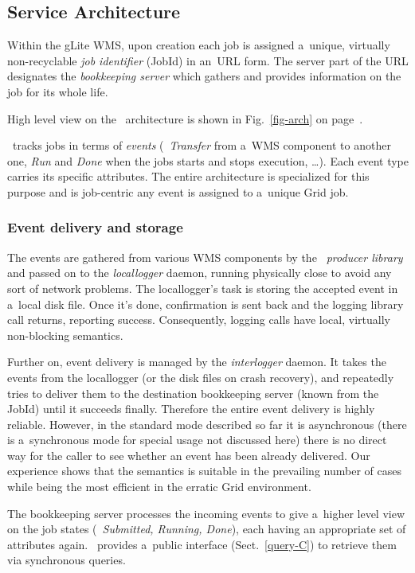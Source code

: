 \subsection{Service Architecture}

Within the gLite WMS, upon creation
 each job is assigned a~unique, virtually non-recyclable
\emph{job identifier} (JobId) in an~URL form.
The server part of the URL designates the \emph{bookkeeping server} which
gathers and provides information on the job for its whole life.

High level view on the \LB\ architecture is shown in Fig.~\ref{fig-arch}
on page~\pageref{fig-arch}.

\LB\ tracks jobs in terms of \emph{events} (\eg\ \emph{Transfer} from a~WMS
component to another one, \emph{Run} and \emph{Done} when the jobs starts
and stops execution, \dots).
Each event type carries its specific attributes.
The entire architecture is specialized for this purpose and is job-centric\Dash
any event is assigned to a~unique Grid job.

\subsubsection{Event delivery and storage}
The events are gathered from various WMS components by the
\emph{\LB\ producer library}
and passed on to the \emph{locallogger} daemon,
running physically close to avoid
any sort of network problems.
The locallogger's task is storing the accepted event in a~local disk file.
Once it's done, confirmation is sent back and the logging library call
returns, reporting success.
Consequently, logging calls have local, virtually non-blocking semantics.

Further on, event delivery is managed by the \emph{interlogger} daemon.
It takes the events from the locallogger (or the disk files on crash recovery),
and repeatedly tries to deliver them to the destination
bookkeeping server (known from the JobId) until it succeeds finally.
Therefore the entire event delivery is highly reliable.
However, in the standard mode described so far it is asynchronous
(there is a~synchronous mode for special usage not discussed here)
there is no direct way for the caller to see whether an event has been
already delivered.
Our experience shows that the semantics is suitable in the prevailing number
of cases while being the most efficient in the erratic Grid environment.

The bookkeeping server processes the incoming events
to give a~higher level view
on the job states (\eg\ \emph{Submitted, Running, Done}),
each having an appropriate set of attributes again.
\LB\ provides a~public interface (Sect.~\ref{query-C})
to retrieve them via synchronous queries.


